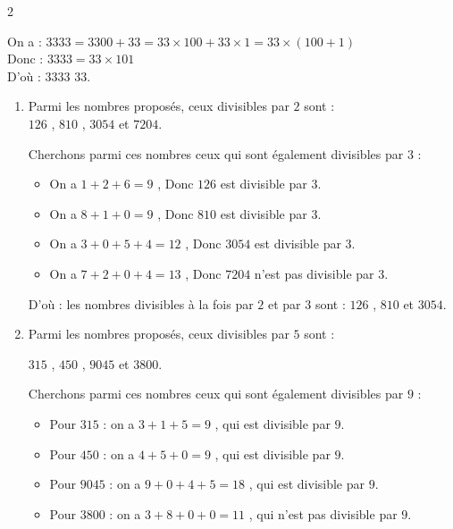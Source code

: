 \documentclass[10pt, a4paper]{article}
\begin{document}
\begin{multicols*}{2}
\begin{Solution}[APPLICATION][4]
\begin{enumerate}[leftmargin=*,itemsep=0.5pt]
    On a :
    $3333 = 3300 + 33 = 33 \times 100 + 33 \times 1 = 33 \times (100 + 1)$ \\
    Donc : $3333 = 33 \times 101$ \\
    D'où : \quad $3333$  $33$.
\end{enumerate}
\end{Solution}

\begin{Solution}[APPLICATION][5]
\begin{enumerate}[leftmargin=*,itemsep=0.5pt]
    \item Parmi les nombres proposés, ceux divisibles par $2$ sont : \\
    $126$ , $810$  , $3054$ et $7204$.

    Cherchons parmi ces nombres ceux qui sont également divisibles par $3$ :
    \begin{itemize}[leftmargin=*,itemsep=0.5pt]
        \item On a $1+2+6 = 9$ , Donc $126$ est divisible par $3$.
        \item On a $8+1+0 = 9$ , Donc $810$ est divisible par $3$.
        \item On a $3+0+5+4 = 12$ , Donc $3054$ est divisible par $3$.
        \item On a $7+2+0+4 = 13$ , Donc $7204$ n'est pas divisible par $3$.
    \end{itemize}

    D'où : \quad les nombres divisibles à la fois par $2$ et par $3$ sont : $126$ , $810$ et $3054$.

    \item Parmi les nombres proposés, ceux divisibles par $5$ sont : 
    
    $315$ , $450$ , $9045$ et $3800$.

    Cherchons parmi ces nombres ceux qui sont également divisibles par $9$ :
    \begin{itemize}[leftmargin=*,itemsep=0.5pt]
        \item Pour $315$ : on a $3+1+5 = 9$ , qui est divisible par $9$.
        \item Pour $450$ : on a $4+5+0 = 9$ , qui est divisible par $9$.
        \item Pour $9045$ : on a $9+0+4+5 = 18$ , qui est divisible par $9$.
        \item Pour $3800$ : on a $3+8+0+0 = 11$ , qui n'est pas divisible par $9$.
    \end{itemize}


\end{enumerate}
\end{Solution}
\end{multicols*}
\end{document}
